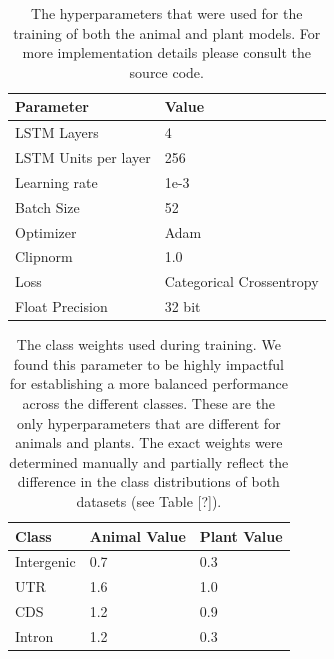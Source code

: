 \documentclass{article}
\begin{document}
\begin{table}[!h]
\renewcommand\thetable{S3}
\centering
\begin{tabular}{@{}ll@{}}
\hline
Parameter & Value \\ [0.5ex]
\hline
LSTM Layers & 4 \\
LSTM Units per layer & 256 \\
Learning rate & 1e-3 \\
Batch Size & 52 \\
Optimizer & Adam \\
Clipnorm & 1.0 \\
Loss & Categorical Crossentropy \\
Float Precision & 32 bit \\
\hline
\end{tabular}
\caption{The hyperparameters that were used for the training of both the animal and plant models. For more implementation details please consult the source code.}
\label{suptab:params}
\end{table}

\begin{table}[!h]
\renewcommand\thetable{S4}
\centering
\begin{tabular}{@{}lll@{}}
\hline
Class & Animal Value & Plant Value \\ [0.5ex]
\hline
Intergenic & 0.7 & 0.3 \\
UTR & 1.6 & 1.0 \\
CDS & 1.2 & 0.9 \\
Intron & 1.2 & 0.3 \\
\hline
\end{tabular}
\caption{The class weights used during training. We found this parameter to be highly impactful for establishing a more balanced performance across the different classes. These are the only hyperparameters that are different for animals and plants. The exact weights were determined manually and partially reflect the difference in the class distributions of both datasets (see Table [?]).}
\end{table}


\newpage
\end{document}
